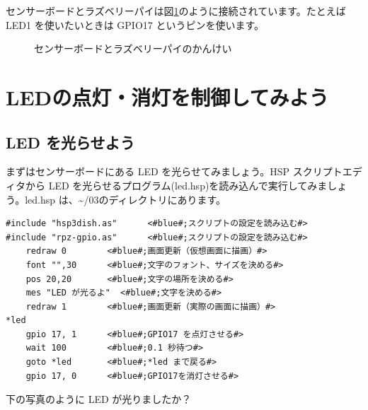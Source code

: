 センサーボードとラズベリーパイは図\ref{sensors}のように接続されています。たとえば LED1 を使いたいときは GPIO17 というピンを使います。

\begin{figure}[H]
    \centering
    
    \caption{センサーボードとラズベリーパイのかんけい}
    \label{sensors}
\end{figure}

\section{LEDの点灯・消灯を制御してみよう}
\subsection{LED を光らせよう}

まずはセンサーボードにある LED を光らせてみましょう。HSP スクリプトエディタから LED を光らせるプログラム(led.hsp)を読み込んで実行してみましょう。led.hsp は、\textasciitilde /03のディレクトリにあります。\\

\begin{lstlisting}[caption=led.hsp,label=led.hsp]
#include "hsp3dish.as"		<#blue#;スクリプトの設定を読み込む#>
#include "rpz-gpio.as"		<#blue#;スクリプトの設定を読み込む#>
	redraw 0		<#blue#;画面更新（仮想画面に描画）#>
	font "",30		<#blue#;文字のフォント、サイズを決める#>
	pos 20,20		<#blue#;文字の場所を決める#>
	mes "LED が光るよ"	<#blue#;文字を決める#>
	redraw 1		<#blue#;画面更新（実際の画面に描画）#>
*led
	gpio 17, 1		<#blue#;GPIO17 を点灯させる#>
	wait 100		<#blue#;0.1 秒待つ#>
	goto *led		<#blue#;*led まで戻る#>
	gpio 17, 0		<#blue#;GPIO17を消灯させる#>
\end{lstlisting}

下の写真のように LED が光りましたか？\\


